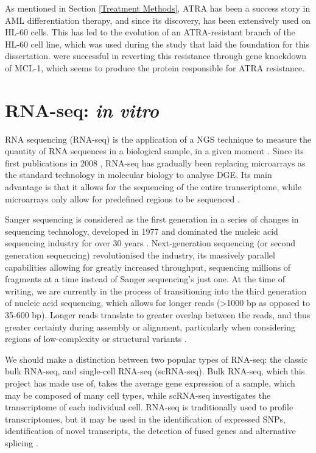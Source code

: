 As mentioned in Section \ref{Treatment Methods}, \ac{ATRA} has been a success story in \ac{AML} differentiation therapy, and since its discovery, has been extensively used on HL-60 cells. This has led to the evolution of an ATRA-resistant branch of the HL-60 cell line, which was used during the study \citep{Gatt2016} that laid the foundation for this dissertation. \cite{fu2005effects} were successful in reverting this resistance through gene knockdown of MCL-1, which seems to produce the protein responsible for \ac{ATRA} resistance.


\clearpage
\section{RNA-seq: \textit{in vitro}}
RNA sequencing (RNA-seq) is the application of a \ac{NGS} technique to measure the quantity of RNA sequences in a biological sample, in a given moment \citep{zhong2009}. Since its first publications in 2008 \citep{nagalakshmi2008transcriptional, lister2008highly, cloonan2008stem}, RNA-seq has gradually been replacing microarrays as the standard technology in molecular biology to analyse \ac{DGE}. Its main advantage is that it allows for the sequencing of the entire transcriptome, while microarrays only allow for predefined regions to be sequenced \citep{rao2019comparison}. 

Sanger sequencing is considered as the first generation in a series of changes in sequencing technology, developed in 1977 and dominated the nucleic acid sequencing industry for over 30 years \citep{behjati2013next}. Next-generation sequencing (or second generation sequencing) revolutionised the industry, its massively parallel capabilities allowing for greatly increased throughput, sequencing millions of fragments at a time instead of Sanger sequencing's just one. At the time of writing, we are currently in the process of transitioning into the third generation of nucleic acid sequencing, which allows for longer reads (>1000 bp as opposed to 35-600 bp). Longer reads translate to greater overlap between the reads, and thus greater certainty during assembly or alignment, particularly when considering regions of low-complexity or structural variants \citep{rhoads2015pacbio}. 

We should make a distinction between two popular types of RNA-seq: the classic bulk RNA-seq, and single-cell RNA-seq (scRNA-seq). Bulk RNA-seq, which this project has made use of, takes the average gene expression of a sample, which may be composed of many cell types, while scRNA-seq investigates the transcriptome of each individual cell. RNA-seq is traditionally used to profile transcriptomes, but it may be used in the identification of expressed SNPs, identification of novel transcripts, the detection of fused genes and alternative splicing \citep{han2015alternative, zhao2014comparison}. 

